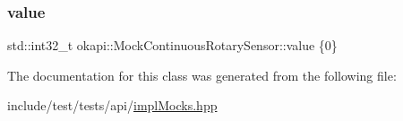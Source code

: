 \subsubsection{\texorpdfstring{value}{value}}
{\footnotesize\ttfamily std\+::int32\+\_\+t okapi\+::\+Mock\+Continuous\+Rotary\+Sensor\+::value \{0\}\hspace{0.3cm}{\ttfamily [mutable]}}



The documentation for this class was generated from the following file\+:\begin{DoxyCompactItemize}
\item 
include/test/tests/api/\mbox{\hyperlink{implMocks_8hpp}{impl\+Mocks.\+hpp}}\end{DoxyCompactItemize}
